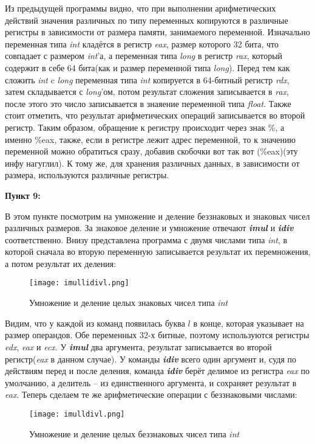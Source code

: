 \documentclass[a4paper,12pt]{article}
\begin{document}
Из предыдущей программы видно, что при выполнении арифметических действий значения различных по типу переменных копируются в различные регистры в зависимости от размера памяти, занимаемого переменной. Изначально переменная типа \textit{int} кладётся в регистр \textit{eax}, размер которого 32 бита, что совпадает с размером \textit{int}'а, а переменная типа \textit{long} в регистр \textit{rax}, который содержит в себе 64 бита(как и размер переменной типа \textit{long}). Перед тем как сложить \textit{int} c \textit{long} переменная типа \textit{int} копируется в 64-битный регистр \textit{rdx}, затем складывается с \textit{long}'ом, потом результат сложения записывается в \textit{rax}, после этого это число записывается в знаяение переменной типа \textit{float}. Также стоит отметить, что результат арифметических операций записывается во второй регистр. Таким образом, обращение к регистру происходит через знак \%, а именно \%eax, также, если в регистре лежит адрес переменной, то к значению переменной можно обратиться сразу, добавив скобочки вот так вот (\%eax)(эту инфу нагуглил). К тому же, для хранения различных данных, в зависимости от размера, используются различные регистры.

\textbf{Пункт 9:}

В этом пункте посмотрим на умножение и деление беззнаковых и знаковых чисел различных размеров. За знаковое деление и умножение отвечают \textit{\textbf{imul}} и \textit{\textbf{idiv}} соответственно. Внизу представлена программа с двумя числами типа \textit{int}, в которой сначала во вторую переменную записывается результат их перемножения, а потом результат их деления: 
\begin{figure}[H]\label{fig: imull idivl}
    \centering
    \texttt{[image: imullidivl.png]}
    \caption*{Умножение и деление целых знаковых чисел типа \textit{int}}
\end{figure}
\newpage

Видим, что у каждой из команд появилась буква $l$ в конце, которая указывает на размер операндов. Обе переменных 32-х битные, поэтому используются регистры \textit{edx}, \textit{eax} и \textit{ecx}. У \textit{\textbf{imul}} два аргумента, результат записывается во второй регистр(\textit{eax} в данном случае). У команды \textit{\textbf{idiv}} всего один аргумент и, судя по действиям перед и после деления, команда \textit{\textbf{idiv}} берёт делимое из регистра \textit{eax} по умолчанию, а делитель -- из единственного аргумента, и сохраняет результат в \textit{eax}. Теперь сделаем те же арифметические операции с беззнаковыми числами:
\begin{figure}[H]\label{fig: imull divl}
    \centering
    \texttt{[image: imulldivl.png]}
    \caption*{Умножение и деление целых беззнаковых чисел типа \textit{int}}
\end{figure}
\end{document}
